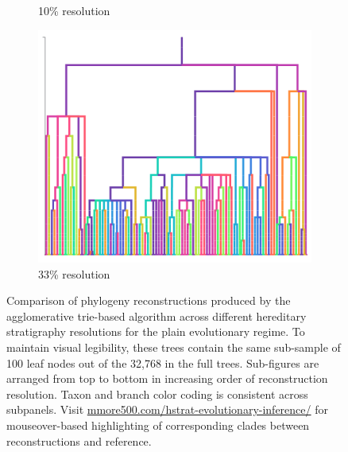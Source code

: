 \begin{figure}
\begin{subfigure}[b]{\linewidth}
    \caption{%
      10\% resolution}
    \label{fig:plain-perfect-and-reconstruction-phylogenies:resolution_10}
  \end{subfigure}
  \begin{subfigure}[b]{\linewidth}
    \centering
    \includegraphics[width=\textwidth, height=0.13\textheight]{img/plain_resolution_3} \caption{%
      33\% resolution}
    \label{fig:plain-perfect-and-reconstruction-phylogenies:resolution_3}
  \end{subfigure}
  \caption{%
    Comparison of phylogeny reconstructions produced by the agglomerative trie-based algorithm across different hereditary stratigraphy resolutions for the plain evolutionary regime.
    To maintain visual legibility, these trees contain the same sub-sample of 100 leaf nodes out of the 32,768 in the full trees.
    Sub-figures are arranged from top to bottom in increasing order of reconstruction resolution.
    Taxon and branch color coding is consistent across subpanels.
    Visit \url{mmore500.com/hstrat-evolutionary-inference/} for mouseover-based highlighting of corresponding clades between reconstructions and reference.
  }
  \label{fig:plain-perfect-and-reconstruction-phylogenies}
\end{figure}
